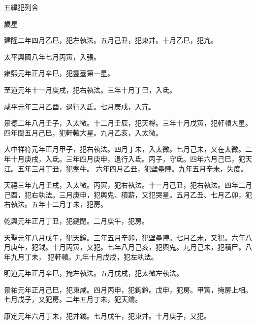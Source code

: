 
\begin{pinyinscope}

 五緯犯列舍



 歲星



 建隆二年四月乙巳，犯左執法。五月己丑，犯東井。十月乙巳，犯亢。



 太平興國八年七月丙寅，入張。



 雍熙元年正月辛巳，犯靈臺第一星。



 至道元年十一月庚戌，犯右執法。三年十月丁巳，入氐。



 咸平元年三月乙酉，退行入氐。七月庚戌，入亢。



 景德二年八月壬子，入太微。十二月壬辰，犯天樽。三年十月戊寅，犯軒轅大星。四年閏五月己巳，犯軒轅大星。九月乙亥，入太微。



 大中祥符元年正月甲子，犯右執法。四月丁未，入太微。七月己未，又在太微。二年十月庚戌，入氐。三年四月庚申，退行入氐。丙子，守氐。四年六月己巳，犯天江。五年三月丁丑，犯牽牛。
 六年四月乙丑，犯壁壘陣。九年五月辛未，失度。



 天禧三年九月壬戌，入太微。丙寅，犯右執法。十一月己丑，犯右執法。四年二月己酉，犯右執法。三月庚申，犯輿鬼、積薪，又犯哭星。五月乙丑、七月乙卯，犯右執法。五年十二月丁未，犯房。



 乾興元年正月丁丑，犯鍵閉。二月庚午，犯房。



 天聖元年八月戊午，犯天鑰。三年五月辛卯，犯壁壘陣。七月乙未，又犯。六年八月庚午，犯鉞。十月丙寅，又犯。七年八月己亥，犯輿鬼。九月己未，犯積尸。八年九月丁未，
 犯軒轅。九年十月戊戌，犯左執法。



 明道元年正月辛巳，掩左執法。五月戊戌，犯太微左執法。



 景祐元年正月己巳，犯東咸。四月丙申，犯鉤鈐。戊申，犯房。甲寅，掩房上相。七月戊子，又犯房。二年五月丁未，犯天鑰。



 康定元年六月丁未，犯井鉞。七月戊午，犯東井。十月庚子，又犯。




\end{pinyinscope}
